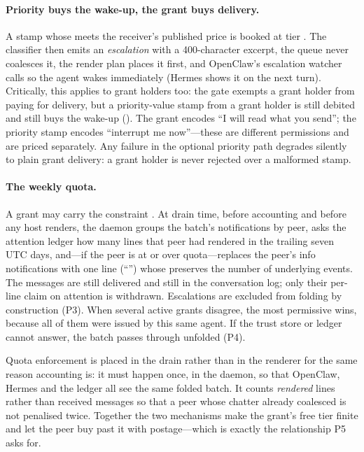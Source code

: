 \paragraph{Priority buys the wake-up, the grant buys delivery.}
A stamp whose  meets the receiver's published  price is booked
at tier . The classifier then emits an \emph{escalation} with a
400-character excerpt, the queue never coalesces it, the render plan places it first,
and OpenClaw's escalation watcher calls  so the agent wakes
immediately (Hermes shows it on the next turn). Critically, this applies to grant holders
too: the gate exempts a grant holder from paying for delivery, but a priority-value stamp
from a grant holder is still debited and still buys the wake-up
(). The grant encodes ``I will read what you send'';
the priority stamp encodes ``interrupt me now''---these are different permissions and are
priced separately. Any failure in the optional priority path degrades silently to plain
grant delivery: a grant holder is never rejected over a malformed stamp.

\paragraph{The weekly quota.}
A  grant may carry the constraint . At
drain time, before accounting and before any host renders, the daemon groups the batch's
 notifications by peer, asks the attention ledger how many lines that peer had
rendered in the trailing seven UTC days, and---if the peer is at or over quota---replaces
the peer's info notifications with one  line
(``'') whose  preserves the number of underlying events. The messages
are still delivered and still in the conversation log; only their per-line claim on
attention is withdrawn. Escalations are excluded from folding by construction (P3). When
several active grants disagree, the most permissive wins, because all of them were issued
by this same agent. If the trust store or ledger cannot answer, the batch passes through
unfolded (P4).

Quota enforcement is placed in the drain rather than in the renderer for the same reason
accounting is: it must happen once, in the daemon, so that OpenClaw, Hermes and the
ledger all see the same folded batch. It counts \emph{rendered} lines rather than
received messages so that a peer whose chatter already coalesced is not penalised twice.
Together the two mechanisms make the grant's free tier finite and let the peer buy past it
with postage---which is exactly the relationship P5 asks for.
